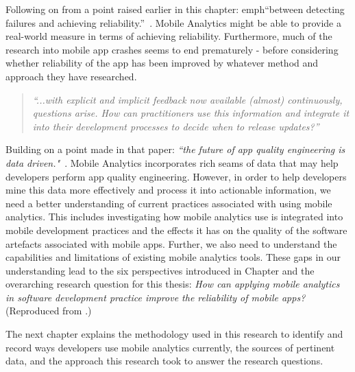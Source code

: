 Following on from a point raised earlier in this chapter: emph{``between detecting failures and achieving reliability.''}~. Mobile Analytics might be able to provide a real-world measure in terms of achieving reliability. Furthermore, much of the research into mobile app crashes seems to end prematurely - before considering whether reliability of the app has been improved by whatever method and approach they have researched.

\begin{quote}
    \emph{``...with explicit and implicit feedback now available (almost) continuously, questions arise. How can practitioners use this information and integrate it into their development processes to decide when to release updates?''}    
\end{quote}

Building on a point made in that paper: \emph{``the future of app quality engineering is data driven."}~. Mobile Analytics incorporates rich seams of data that may help developers perform app quality engineering. However, in order to help developers mine this data more effectively and process it into actionable information, we need a better understanding of current practices associated with using mobile analytics. This includes investigating how mobile analytics use is integrated into mobile development practices and the effects it has on the quality of the software artefacts associated with mobile apps. Further, we also need to understand the capabilities and limitations of existing mobile analytics tools. These gaps in our understanding lead to the six perspectives introduced in Chapter  and the overarching research question for this thesis: \emph{How can applying mobile analytics in software development practice improve the reliability of mobile apps?} (Reproduced from .)

The next chapter explains the methodology used in this research to identify and record ways developers use mobile analytics currently, the sources of pertinent data, and the approach this research took to answer the research questions.
